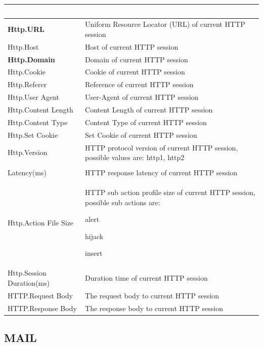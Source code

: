 \begin{longtable}{p{}|p{}}   
    \rowcolor{black}\multicolumn{1}{l!\vlinewhite}{\textcolor{white}{Field}}  & \textcolor{white}{Description} \\\hline
    \textbf{Http.URL} &	Uniform Resource Locator (URL) of current HTTP session \\\hline
    Http.Host &	Host of current HTTP session \\\hline
    \textbf{Http.Domain} &	Domain of current HTTP session \\\hline
    Http.Cookie &	Cookie of current HTTP session \\\hline
    Http.Referer &	Reference of current HTTP session \\\hline
    Http.User Agent &	User-Agent of current HTTP session \\\hline
    Http.Content Length &	Content Length of current HTTP session \\\hline
    Http.Content Type &	Content Type of current HTTP session \\\hline
    Http.Set Cookie &	Set Cookie of current HTTP session \\\hline
    Http.Version &	HTTP protocol version of current HTTP session, possible values are: http1, http2 \\\hline
    \tabincell{l}{Http.Response\\ Latency(ms)} &	HTTP response latency of current HTTP session \\\hline
    Http.Action File Size &	HTTP sub action profile size of current HTTP session, possible sub actions are:


                            alert


                            hijack


                            insert \\\hline
    Http.Session Duration(ms) &	Duration time of current HTTP session \\\hline
    HTTP.Request Body &	The request body to current HTTP session \\\hline
    HTTP.Response Body &	The response body to current HTTP session \\\hline

\end{longtable}

\subsection*{\hypertarget{link:MAIL}{MAIL}}
\label{sec:appendix_c:protocol:MAIL}


